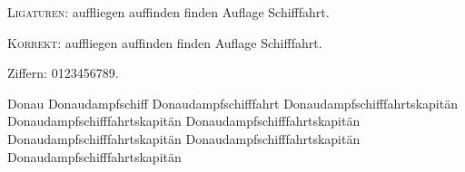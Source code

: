 \documentclass[12pt]{scrartcl}
\begin{document}
\textsc{Ligaturen}: auffliegen auffinden finden Auflage Schifffahrt.

\textsc{Korrekt}: auf\/fliegen auf\/finden finden Auf\/lage Schiff\/fahrt.

Ziffern: 0123456789.

Donau Donaudampfschiff Donaudampfschifffahrt Donaudampfschifffahrtskapitän 
Donaudampfschifffahrtskapitän 
Donaudampfschifffahrtskapitän Donaudampfschifffahrtskapitän 
Donaudampfschifffahrtskapitän Donaudampfschifffahrtskapitän
\end{document}
